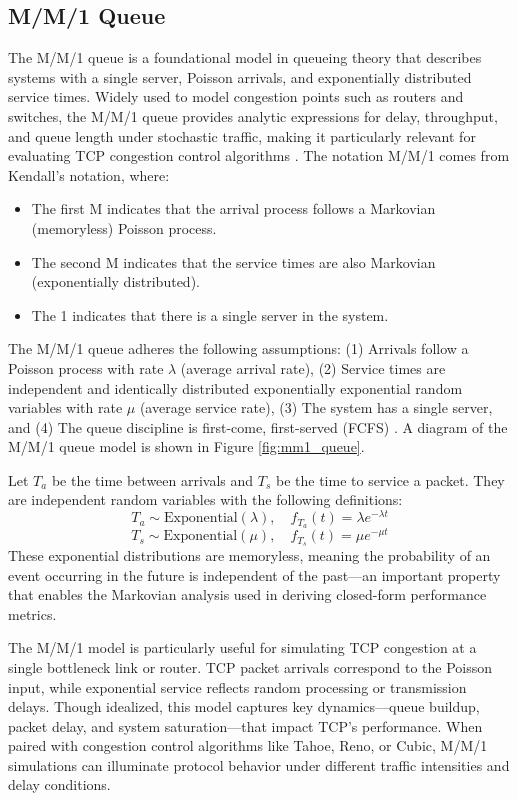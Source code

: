 \documentclass[conference]{IEEEtran}
\begin{document}
\subsection{M/M/1 Queue}
The M/M/1 queue is a foundational model in queueing theory that describes systems with a single server, Poisson arrivals, and exponentially distributed service times. 
Widely used to model congestion points such as routers and switches, the M/M/1 queue provides analytic expressions for delay, throughput, and queue length under stochastic traffic, making it particularly relevant for evaluating TCP congestion control algorithms \cite{b1}.
The notation M/M/1 comes from Kendall's notation, where:
\begin{itemize}[]
    \item The first M indicates that the arrival process follows a Markovian (memoryless) Poisson process.
    \item The second M indicates that the service times are also Markovian (exponentially distributed).
    \item The 1 indicates that there is a single server in the system.
\end{itemize}

The M/M/1 queue adheres the following assumptions:
(1) Arrivals follow a Poisson process with rate $\lambda$ (average arrival rate),
(2) Service times are  independent and identically distributed exponentially exponential random variables with rate $\mu$ (average service rate),
(3) The system has a single server, and
(4) The queue discipline is first-come, first-served (FCFS) \cite{b6}.
A diagram of the M/M/1 queue model is shown in Figure \ref{fig:mm1_queue}.

Let $T_a$ be the time between arrivals and $T_s$ be the time to service a packet.
They are independent random variables with the following definitions:
\begin{equation}
    T_a \sim \text{Exponential}(\lambda), \quad f_{T_a}(t) = \lambda e^{-\lambda t} \label{eq:5}
\end{equation}
\begin{equation}
    T_s \sim \text{Exponential}(\mu), \quad f_{T_s}(t) = \mu e^{-\mu t} \label{eq:6}
\end{equation}
These exponential distributions are memoryless, meaning the probability of an event occurring in the future is independent of the past—an important property that enables the Markovian analysis used in deriving closed-form performance metrics.

The M/M/1 model is particularly useful for simulating TCP congestion at a single bottleneck link or router. 
TCP packet arrivals correspond to the Poisson input, while exponential service reflects random processing or transmission delays. 
Though idealized, this model captures key dynamics—queue buildup, packet delay, and system saturation—that impact TCP’s performance. 
When paired with congestion control algorithms like Tahoe, Reno, or Cubic, M/M/1 simulations can illuminate protocol behavior under different traffic intensities and delay conditions.
\end{document}
